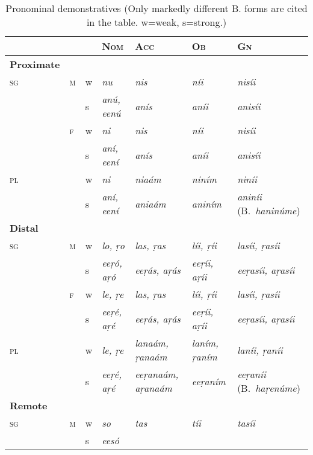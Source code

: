 

\begin{table}[htp]
\caption{Pronominal demonstratives{\protect\footnotemark} (Only markedly different B. forms are cited in the table. w=weak, s=strong.)}
\begin{tabularx}{\textwidth}{ l l l Q Q Q P{23mm} }
\lsptoprule
&
&
&
\textsc{Nom} &
\textsc{Acc} &
\textsc{Ob} &
\textsc{Gn}\\\hline
\textbf{Proximate} &
&
&
&
&
&
\\
\textsc{sg} &
\textsc{m} &
w &
\textit{nu} &
\textit{nis} &
\textit{níi} &
\textit{nisíi} \\
&
&
s &
\textit{anú, eenú} &
\textit{anís} &
\textit{aníi} &
\textit{anisíi} \\
&
\textsc{f} &
w &
\textit{ni} &
\textit{nis} &
\textit{níi} &
\textit{nisíi} \\
&
&
s &
\textit{aní, eení} &
\textit{anís} &
\textit{aníi} &
\textit{anisíi} \\
\textsc{pl} &
&
w &
\textit{ni} &
\textit{niaám} &
\textit{niním} &
\textit{niníi} \\
&
&
s &
\textit{aní, eení} &
\textit{aniaám} &
\textit{aniním} &
\textit{aniníi} (B.~\textit{haninúme})\\
\textbf{Distal} &
&
&
&
&
&
\\
\textsc{sg} &
\textsc{m} &
w &
\textit{lo, ṛo} &
\textit{las, ṛas} &
\textit{líi, ṛíi} &
\textit{lasíi, ṛasíi} \\
&
&
s &
\textit{eeṛó, aṛó} &
\textit{eeṛás, aṛás} &
\textit{eeṛíi, aṛíi} &
\textit{eeṛasíi, aṛasíi} \\
&
\textsc{f} &
w &
\textit{le, ṛe} &
\textit{las, ṛas} &
\textit{líi, ṛíi} &
\textit{lasíi, ṛasíi} \\
&
&
s &
\textit{eeṛé, aṛé} &
\textit{eeṛás, aṛás} &
\textit{eeṛíi, aṛíi} &
\textit{eeṛasíi, aṛasíi} \\
\textsc{pl} &
&
w &
\textit{le, ṛe} &
\textit{lanaám, ṛanaám} &
\textit{laním, ṛaním} &
\textit{laníi, ṛaníi} \\
&
&
s &
\textit{eeṛé, aṛé} &
\textit{eeṛanaám, aṛanaám} &
\textit{eeṛaním} &
\textit{eeṛaníi} (B.~\textit{haṛenúme})\\
\textbf{Remote} &
&
&
&
&
&
\\
\textsc{sg} &
\textsc{m} &
w &
\textit{so} &
\textit{tas} &
\textit{tíi} &
\textit{tasíi} \\
&
&
s &
\textit{eesó} &

\end{tabularx}
\end{table}

